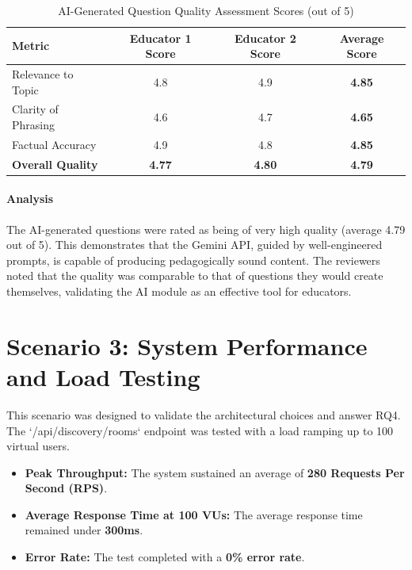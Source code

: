 \begin{table}[htbp]
\centering
\caption{AI-Generated Question Quality Assessment Scores (out of 5)}
\label{tab:ai-quality-results}
\begin{tabular}{l c c c}
\toprule
\textbf{Metric} & \textbf{Educator 1 Score} & \textbf{Educator 2 Score} & \textbf{Average Score} \\
\midrule
Relevance to Topic & 4.8 & 4.9 & \textbf{4.85} \\
Clarity of Phrasing & 4.6 & 4.7 & \textbf{4.65} \\
Factual Accuracy & 4.9 & 4.8 & \textbf{4.85} \\
\midrule
\textbf{Overall Quality} & \textbf{4.77} & \textbf{4.80} & \textbf{4.79} \\
\bottomrule
\end{tabular}
\end{table}

\paragraph{Analysis}
The AI-generated questions were rated as being of very high quality (average 4.79 out of 5). This demonstrates that the Gemini API, guided by well-engineered prompts, is capable of producing pedagogically sound content. The reviewers noted that the quality was comparable to that of questions they would create themselves, validating the AI module as an effective tool for educators.

\section{Scenario 3: System Performance and Load Testing}
\label{sec:eval-scenario3}
This scenario was designed to validate the architectural choices and answer RQ4. The `/api/discovery/rooms` endpoint was tested with a load ramping up to 100 virtual users.

\begin{itemize}
    \item \textbf{Peak Throughput:} The system sustained an average of \textbf{280 Requests Per Second (RPS)}.
    \item \textbf{Average Response Time at 100 VUs:} The average response time remained under \textbf{300ms}.
    \item \textbf{Error Rate:} The test completed with a \textbf{0\% error rate}.
\end{itemize}

